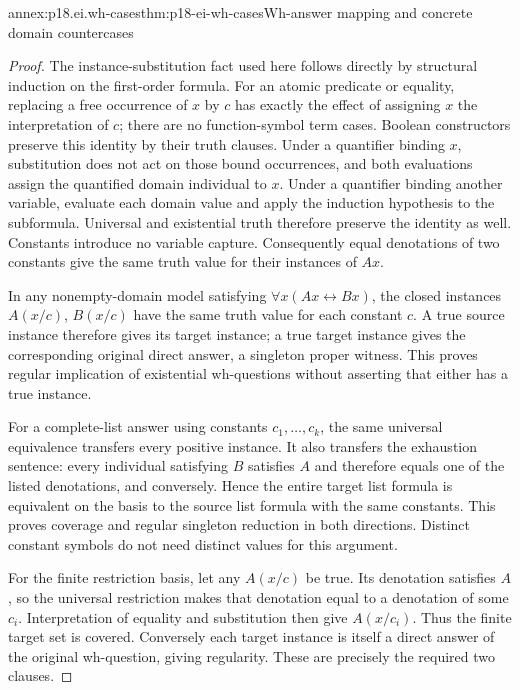 \begin{annexitem}{annex:p18.ei.wh-cases}{thm:p18-ei-wh-cases}{Wh-answer mapping and concrete domain countercases}
\begin{proof}
The instance-substitution fact used here follows directly by structural
induction on the first-order formula. For an atomic predicate or equality,
replacing a free occurrence of \(x\) by \(c\) has exactly the effect of
assigning \(x\) the interpretation of \(c\); there are no function-symbol
term cases. Boolean constructors preserve this identity by their truth
clauses. Under a quantifier binding \(x\), substitution does not act on
those bound occurrences, and both evaluations assign the quantified domain
individual to \(x\). Under a quantifier binding another variable, evaluate
each domain value and apply the induction hypothesis to the subformula.
Universal and existential truth therefore preserve the identity as well.
Constants introduce no variable capture. Consequently equal denotations of
two constants give the same truth value for their instances of \(Ax\).

In any nonempty-domain model satisfying \(\forall x(Ax\leftrightarrow Bx)\),
the closed instances \(A(x/c)\), \(B(x/c)\) have the same truth value for
each constant \(c\). A true source instance therefore gives its target
instance; a true target instance gives the corresponding original direct
answer, a singleton proper witness. This proves regular implication of
existential wh-questions without asserting that either has a true instance.

For a complete-list answer using constants \(c_1,\ldots,c_k\), the same
universal equivalence transfers every positive instance. It also transfers
the exhaustion sentence: every individual satisfying \(B\) satisfies \(A\)
and therefore equals one of the listed denotations, and conversely. Hence
the entire target list formula is equivalent on the basis to the source list
formula with the same constants. This proves coverage and regular singleton
reduction in both directions. Distinct constant symbols do not need distinct
values for this argument.

For the finite restriction basis, let any \(A(x/c)\) be true. Its denotation
satisfies \(A\), so the universal restriction makes that denotation equal
to a denotation of some \(c_i\). Interpretation of equality and substitution
then give \(A(x/c_i)\). Thus the finite target set is covered. Conversely
each target instance is itself a direct answer of the original wh-question,
giving regularity. These are precisely the required two clauses.


\end{proof}
\end{annexitem}
